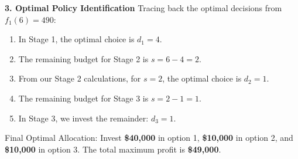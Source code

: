 \begin{solution}
\noindent \textbf{3. Optimal Policy Identification}
Tracing back the optimal decisions from $f_1(6) = 490$:
\begin{enumerate}
    \item In Stage 1, the optimal choice is \textbf{$d_1 = 4$}.
    \item The remaining budget for Stage 2 is $s = 6 - 4 = 2$.
    \item From our Stage 2 calculations, for $s=2$, the optimal choice is \textbf{$d_2 = 1$}.
    \item The remaining budget for Stage 3 is $s = 2 - 1 = 1$.
    \item In Stage 3, we invest the remainder: \textbf{$d_3 = 1$}.
\end{enumerate}
Final Optimal Allocation: Invest \textbf{\$40,000} in option 1, \textbf{\$10,000} in option 2, and \textbf{\$10,000} in option 3.
The total maximum profit is \textbf{\$49,000}.
\end{solution}
